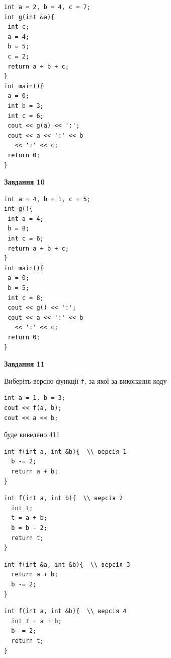 \documentclass[12pt, ukrainian]{article}
\def\code#1{\Verb!#1!}
\begin{document}
{\begin {large}
\begin{minipage}[t]{7.0cm}
\begin{verbatim}
int a = 2, b = 4, c = 7;
int g(int &a){
 int c;
 a = 4;
 b = 5;
 c = 2;
 return a + b + c;
}
int main(){
 a = 0;
 int b = 3;
 int c = 6;
 cout << g(a) << ':';
 cout << a << ':' << b 
   << ':' << c;
 return 0;
}
\end{verbatim}



\begin{center}
\textbf{Завдання 10}
\end{center}
\vspace{-8mm}

\begin{verbatim}
int a = 4, b = 1, c = 5;
int g(){
 int a = 4;
 b = 8;
 int c = 6;
 return a + b + c;
}
int main(){
 a = 0;
 b = 5;
 int c = 8;
 cout << g() << ':';
 cout << a << ':' << b 
   << ':' << c;
 return 0;
}
\end{verbatim}

\end{minipage}
\vline \hspace{1mm}
\begin{minipage}[t]{11.0cm}

\begin{center}
\textbf{Завдання 11}
\end{center}
Виберіть версію функції \code{f}, за якої за виконання коду
\begin{verbatim}
int a = 1, b = 3;
cout << f(a, b);
cout << a << b;
\end{verbatim}

буде виведено 411

\begin{verbatim}
int f(int a, int &b){  \\ версія 1
  b -= 2;
  return a + b;
}
\end{verbatim}

\vspace{-8mm}\begin{verbatim}
int f(int a, int b){  \\ версія 2
  int t;
  t = a + b;
  b = b - 2;
  return t;
}
\end{verbatim}

\vspace{-8mm}\begin{verbatim}
int f(int &a, int &b){  \\ версія 3
  return a + b;
  b -= 2;
}
\end{verbatim}

\vspace{-8mm}\begin{verbatim}
int f(int a, int &b){  \\ версія 4
  int t = a + b;
  b -= 2;
  return t;
}
\end{verbatim}




\end{minipage}
\end{large}}
\end{document}

